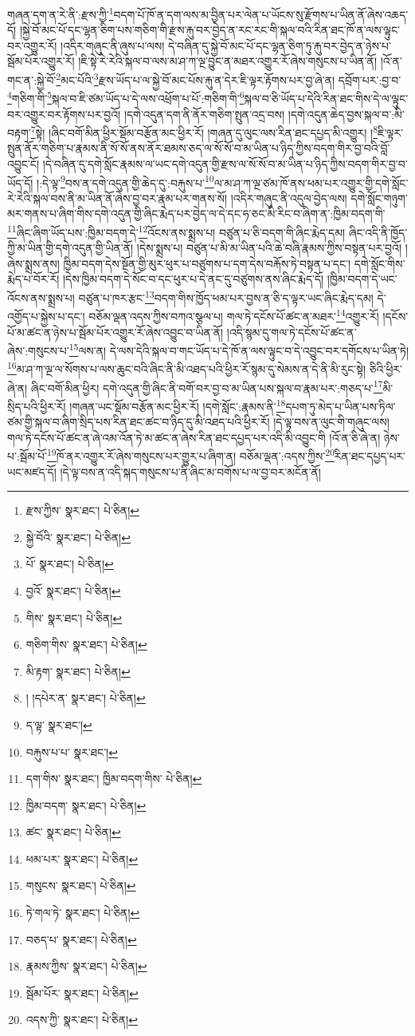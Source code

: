 གཞན་དག་ན་རེ་ནི་:རྫས་ཀྱི་\footnote{རྫས་ཀྱིས་  སྣར་ཐང་།  པེ་ཅིན། }བདག་པོ་ཁོ་ན་དག་ལས་མ་བྱིན་པར་ལེན་པ་ཡོངས་སུ་རྫོགས་པ་ཡིན་ནོ་ཞེས་འཆད་དོ། །སྐྱེ་བོ་མང་པོ་དང་ལྷན་ཅིག་པས་གཅིག་གི་རྫས་རྐུ་བར་བྱེད་ན་རང་རང་གི་སྐལ་བའི་རིན་ཐང་ཁོ་ན་ལས་ལྟུང་བར་འགྱུར་རོ། །འདིར་གཞུང་ནི་ཞུས་པ་ལས། དེ་བཞིན་དུ་སྐྱེ་བོ་མང་པོ་དང་ལྷན་ཅིག་ཏུ་རྐུ་བར་བྱེད་ན་ཉེས་པ་སྦོམ་པོར་འགྱུར་རོ། །ཇི་སྟེ་རེ་རེའི་སྐལ་བ་ལས་མ་ཤ་ཀ་ལྔ་བྱུང་ན་མཐར་འགྱུར་རོ་ཞེས་གསུངས་པ་ཡིན་ནོ། །འོ་ན་གང་ན་:སྐྱེ་བོ་\footnote{སྐྱེ་བོའི་  སྣར་ཐང་།  པེ་ཅིན། }མང་པོའི་\footnote{པོ་  སྣར་ཐང་།  པེ་ཅིན། }རྫས་ཡོད་པ་ལ་སྐྱེ་བོ་མང་པོས་རྐུ་ན་དེར་ཇི་ལྟར་རྟོགས་པར་བྱ་ཞེ་ན། དབྲོག་པར་:བྱ་བ་\footnote{བྱའོ་  སྣར་ཐང་།  པེ་ཅིན། }གཅིག་གི་\footnote{གིས་  སྣར་ཐང་།  པེ་ཅིན། }སྐལ་བ་ཇི་ཙམ་ཡོད་པ་དེ་ལས་འཕྲོག་པ་པོ་:གཅིག་གི་\footnote{གཅིག་གིས་  སྣར་ཐང་།  པེ་ཅིན། }སྐལ་བ་ཅི་ཡོད་པ་དེའི་རིན་ཐང་གིས་དེ་ལ་ལྟུང་བར་འགྱུར་བར་རྟོགས་པར་བྱའོ། །དགེ་འདུན་དག་ནི་ནོར་གཅིག་སྤུན་འདྲ་བས། །དགེ་འདུན་ཆེད་བྱས་སྐལ་བ་:མི་བརྟག་\footnote{མི་རྟག་  སྣར་ཐང་།  པེ་ཅིན། }སྟེ། །ཞིང་བགོ་མིན་ཕྱིར་སྡོམ་བརྩོན་མང་ཕྱིར་རོ། །གཞན་དུ་ལུང་ལས་རིན་ཐང་དཔྱད་མི་འགྱུར། །\footnote{། །དཔེར་ན་  སྣར་ཐང་།  པེ་ཅིན། }ཇི་ལྟར་སྤུན་ནོར་གཅིག་པ་རྣམས་ནི་སོ་སོ་ནས་ནོར་ཐམས་ཅད་ལ་སོ་སོ་བ་མ་ཡིན་པ་ཉིད་ཀྱིས་བདག་གིར་བྱ་བའི་བློ་འབྱུང་ངོ། །དེ་བཞིན་དུ་དགེ་སློང་རྣམས་ལ་ཡང་དགེ་འདུན་གྱི་རྫས་ལ་སོ་སོ་བ་མ་ཡིན་པ་ཉིད་ཀྱིས་བདག་གིར་བྱ་བ་ཡོད་དོ། །:དེ་ལྟ་\footnote{ད་ལྟ་  སྣར་ཐང་། }བས་ན་དགེ་འདུན་གྱི་ཆེད་དུ་:བརྐུས་པ་\footnote{བརྐུས་པ་པ་  སྣར་ཐང་། }ལ་མ་ཤ་ཀ་ལྔ་ཙམ་ཁོ་ནས་ཕམ་པར་འགྱུར་གྱི་དགེ་སློང་རེ་རེའི་སྐལ་བས་ནི་མ་ཡིན་ནོ་ཞེས་བྱ་བར་རྣམ་པར་གནས་སོ། །འདིར་གཞུང་ནི་འདུལ་བྱེད་ལས། དགེ་སློང་གཉུག་མར་གནས་པ་ཞིག་གིས་དགེ་འདུན་གྱི་ཞིང་རྨེད་པར་བྱེད་ལ་དེ་དང་ཧ་ཅང་མི་རིང་བ་ཞིག་ན་:ཁྱིམ་བདག་གི་\footnote{དག་གིས་  སྣར་ཐང་། ཁྱིམ་བདག་གིས་  པེ་ཅིན། }ཞིང་ཞིག་ཡོད་པས་:ཁྱིམ་བདག་དེ་\footnote{ཁྱིམ་བདག་  སྣར་ཐང་།  པེ་ཅིན། }འོངས་ནས་སྨྲས་པ། བཙུན་པ་ཅི་བདག་གི་ཞིང་རྨེད་དམ། ཞིང་འདི་ནི་ཁྱོད་ཀྱི་མ་ཡིན་གྱི་དགེ་འདུན་གྱི་ཡིན་ནོ། །དེས་སྨྲས་པ། བཙུན་པ་མི་མ་ཡིན་པའི་ཆེ་བཞི་རྣམས་ཀྱིས་བསྟན་པར་བྱའོ། །ཞེས་སྨྲས་ནས། ཁྱིམ་བདག་དེས་སྔོན་གྱི་མུར་ཕུར་པ་བཙུགས་པ་དག་དེས་བརྐོས་ཏེ་བསྟན་པ་དང་། དགེ་སློང་གིས་རྨེད་པ་བོར་རོ། །དེས་ཁྱིམ་བདག་དེ་སོང་བ་དང་ཕུར་པ་དེ་ནང་དུ་བཙུགས་ནས་ཞིང་རྨེད་དོ། །ཁྱིམ་བདག་དེ་ཡང་འོངས་ནས་སྨྲས་པ། བཙུན་པ་ཁར་རྩང་\footnote{ཚང་  སྣར་ཐང་།  པེ་ཅིན། }བདག་གིས་ཁྱོད་ཕམ་པར་བྱས་ན་ཅི་ད་ལྟར་ཡང་ཞིང་རྨེད་དམ། དེ་འགྱོད་པ་སྐྱེས་པ་དང་། བཅོམ་ལྡན་འདས་ཀྱིས་བཀའ་སྩལ་པ། གལ་ཏེ་དངོས་པོ་ཚང་ན་མཐར་\footnote{ཕམ་པར་  སྣར་ཐང་།  པེ་ཅིན། }འགྱུར་རོ། །དངོས་པོ་མ་ཚང་ན་ཉེས་པ་སྦོམ་པོར་འགྱུར་རོ་ཞེས་འབྱུང་བ་ཡིན་ནོ། །འདི་སྙམ་དུ་གལ་ཏེ་དངོས་པོ་ཚང་ན་ཞེས་:གསུངས་པ་\footnote{གསུངས་  སྣར་ཐང་།  པེ་ཅིན། }ལས་ན། དེ་ལས་དེའི་སྐལ་བ་གང་ཡོད་པ་དེ་ཁོ་ན་ལས་ལྟུང་བ་དེ་འབྱུང་བར་དགོངས་པ་ཡིན་ཏེ། \footnote{ཏེ་གལ་ཏེ་  སྣར་ཐང་།  པེ་ཅིན། }མ་ཤ་ཀ་ལྔ་ལ་སོགས་པ་ལས་ཆུང་བའི་ཞིང་ནི་མི་འཐད་པའི་ཕྱིར་རོ་སྙམ་དུ་སེམས་ན་དེ་ནི་མི་རུང་སྟེ། ཅིའི་ཕྱིར་ཞེ་ན། ཞིང་བགོ་མིན་ཕྱིར། དགེ་འདུན་གྱི་ཞིང་ནི་བགོ་བར་བྱ་བ་མ་ཡིན་པས་སྐལ་བ་རྣམ་པར་:གཅད་པ་\footnote{བཅད་པ་  སྣར་ཐང་།  པེ་ཅིན། }མི་སྲིད་པའི་ཕྱིར་རོ། །གཞན་ཡང་སྡོམ་བརྩོན་མང་ཕྱིར་རོ། །དགེ་སློང་:རྣམས་ནི་\footnote{རྣམས་ཀྱིས་  སྣར་ཐང་།  པེ་ཅིན། }དཔག་ཏུ་མེད་པ་ཡིན་པས་ཏིལ་ཙམ་གྱི་སྐལ་བ་ཞིག་སྲིད་པས་རིན་ཐང་ཚང་བ་ཉིད་དུ་མི་འཐད་པའི་ཕྱིར་རོ། །དེ་ལྟ་བས་ན་ལུང་གི་གཞུང་ལས། གལ་ཏེ་དངོས་པོ་ཚང་ན་ཞེ་འམ་འོན་ཏེ་མ་ཚང་ན་ཞེས་རིན་ཐང་དཔྱད་པར་འདི་མི་འབྱུང་གི །འོ་ན་ཅི་ཞེ་ན། ཉེས་པ་:སྦོམ་པོ་\footnote{སྦོམ་པོར་  སྣར་ཐང་།  པེ་ཅིན། }ཁོ་ནར་འགྱུར་རོ་ཞེས་གསུངས་པར་གྱུར་པ་ཞིག་ན། བཅོམ་ལྡན་:འདས་ཀྱིས་\footnote{འདས་ཀྱི་  སྣར་ཐང་།  པེ་ཅིན། }རིན་ཐང་དཔྱད་པར་ཡང་མཛད་དོ། །དེ་ལྟ་བས་ན་འདི་སྐད་གསུངས་པ་ནི་ཞིང་མ་བགོས་པ་ལ་བྱ་བར་མངོན་ནོ། 